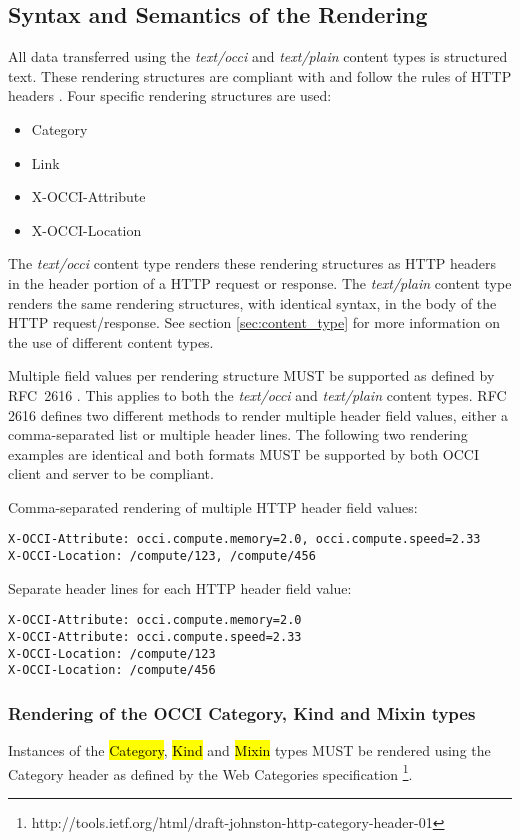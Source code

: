 \documentclass[10pt,a4paper]{article}
\begin{document}
\subsection{Syntax and Semantics of the Rendering}
\label{sec:syntax}
All data transferred using the \textit{text/occi} and
\textit{text/plain} content types is structured text. These rendering structures 
are compliant with and follow the rules of HTTP headers \cite{rfc2616}. 
Four specific rendering structures are used:

\begin{itemize}
  \item Category
  \item Link
  \item X-OCCI-Attribute
  \item X-OCCI-Location
\end{itemize}

The \textit{text/occi} content type renders these rendering structures as HTTP
headers in the header portion of a HTTP request or response. The
\textit{text/plain} content type renders the same rendering structures, with
identical syntax, in the body of the HTTP request/response. See
section \ref{sec:content_type} for more information on the use of
different content types.

Multiple field values per rendering structure MUST be supported as defined by
RFC~2616 \cite{rfc2616}. This applies to both the \textit{text/occi}
and \textit{text/plain} content types. RFC 2616 defines two different
methods to render multiple header field values, either a
comma-separated list or multiple header lines. The following two
rendering examples are identical and both formats MUST be supported by
both OCCI client and server to be compliant.

Comma-separated rendering of multiple HTTP header field values:
\begin{verbatim}
X-OCCI-Attribute: occi.compute.memory=2.0, occi.compute.speed=2.33
X-OCCI-Location: /compute/123, /compute/456
\end{verbatim}

Separate header lines for each HTTP header field value:
\begin{verbatim}
X-OCCI-Attribute: occi.compute.memory=2.0
X-OCCI-Attribute: occi.compute.speed=2.33
X-OCCI-Location: /compute/123
X-OCCI-Location: /compute/456
\end{verbatim}

\subsubsection{Rendering of the OCCI Category, Kind and Mixin types}
\label{sec:render_cats}
Instances of the \hl{Category}, \hl{Kind} and \hl{Mixin} types
\cite{occi:core} MUST be rendered using the Category header as defined
by the Web Categories specification%
\footnote{http://tools.ietf.org/html/draft-johnston-http-category-header-01}.
\end{document}
